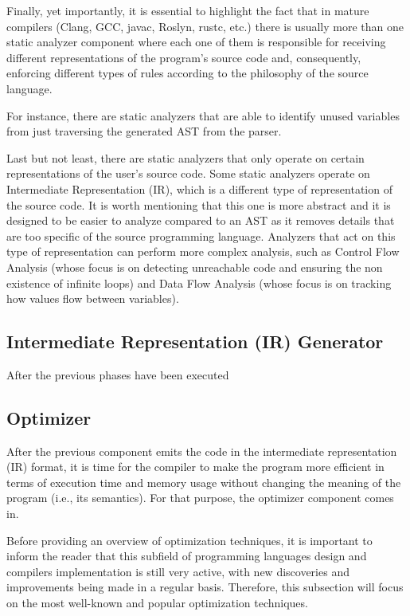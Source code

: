 Finally, yet importantly, it is essential to highlight the fact that in mature compilers (Clang, GCC, javac, Roslyn, rustc, etc.) there is usually more than one static analyzer component where each one of them is responsible for receiving different representations of the program's source code and, consequently, enforcing different types of rules according to the philosophy of the source language.

For instance, there are static analyzers that are able to identify unused variables from just traversing the generated AST from the parser.

Last but not least, there are static analyzers that only operate on certain representations of the user's source code. Some static analyzers operate on Intermediate Representation (IR), which is a different type of representation of the source code. It is worth mentioning that this one is more abstract and it is designed to be easier to analyze compared to an AST as it removes details that are too specific of the source programming language. Analyzers that act on this type of representation can perform more complex analysis, such as Control Flow Analysis (whose focus is on detecting unreachable code and ensuring the non existence of infinite loops) and Data Flow Analysis (whose focus is on tracking how values flow between variables).

\subsection{Intermediate Representation (IR) Generator}
After the previous phases have been executed

\subsection{Optimizer}
After the previous component emits the code in the intermediate representation (IR) format, it is time for the compiler to make the program more efficient in terms of execution time and memory usage without changing the meaning of the program (i.e., its semantics). For that purpose, the optimizer component comes in.

Before providing an overview of optimization techniques, it is important to inform the reader that this subfield of programming languages design and compilers implementation is still very active, with new discoveries and improvements being made in a regular basis. Therefore, this subsection will focus on the most well-known and popular optimization techniques.

